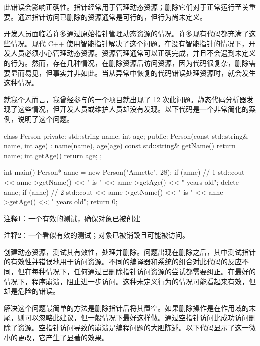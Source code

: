 此错误会影响正确性。指针经常用于管理动态资源；删除它们对于正常运行至关重要。通过指针访问已删除的资源通常是可行的，但行为尚未定义。


开发人员面临着许多通过原始指针管理动态资源的情况。许多现有代码都充满了这些情况。现代 C++ 使用智能指针解决了这个问题。在没有智能指针的情况下，开发人员必须小心管理动态资源。资源管理通常可以正确完成，并且不会遇到未定义的行为。然而，存在几种情况，在删除资源后访问资源，因为代码很复杂，删除需要显而易见，但事实并非如此。当从异常中恢复的代码错误处理资源时，就会发生这种情况。

就我个人而言，我曾经参与的一个项目就出现了 12 次此问题。静态代码分析器发现了这些情况，但开发人员或维护人员却没有发现。以下代码是一个非常简化的案例，说明了这个问题。


\begin{cpp}
class Person {
private:
  std::string name;
  int age;
public:
  Person(const std::string& name, int age) : name(name), age(age) {}
  const std::string& getName() { return name; }
  int getAge() { return age; }
};

int main() {
  Person* anne = new Person("Annette", 28);
  if (anne) // 1
    std::cout << anne->getName() << " is " << anne->getAge()
      << " years old\n";
  delete anne;
  if (anne) // 2
    std::cout << anne->getName() << " is " << anne->getAge()
      << " years old\n";
  return 0;
}
\end{cpp}

{\footnotesize
注释1：一个有效的测试，确保对象已被创建

注释2：一个看似有效的测试；对象已被销毁且可能被访问。
}


创建动态资源，测试其有效性，处理并删除。问题出现在删除之后，其中测试指针的有效性并错误地用于访问资源。不同的编译器和系统的组合对此代码的反应不同，但在每种情况下，任何通过已删除指针访问资源的尝试都需要纠正。在最好的情况下，程序崩溃，阻止进一步访问。这种未定义行为的情况可能看起来有效，但却是危险的错误。


解决这个问题最简单的方法是删除指针后将其置空。如果删除操作是在作用域的末尾，则可以忽略此建议，但一般情况下最好这样做。通过空指针访问比成功访问删除了资源。空指针访问导致的崩溃是编程问题的大胆陈述。以下代码显示了这一微小的更改，它产生了显著的效果。


